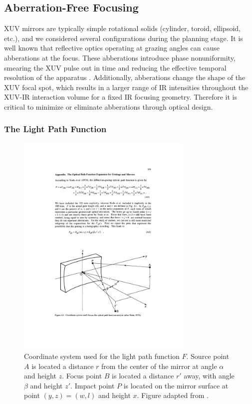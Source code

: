 \subsection{Aberration-Free Focusing}

XUV mirrors are typically simple rotational solids (cylinder, toroid, ellipsoid, etc.), and we considered several configurations during the planning stage. It is well known that reflective optics operating at grazing angles can cause abberations at the focus. These abberations introduce phase nonuniformity, smearing the XUV pulse out in time and reducing the effective temporal resolution of the apparatus \cite{bourassin-bouchetHowFocusAttosecond2013}. Additionally, abberations change the shape of the XUV focal spot, which results in a larger range of IR intensities throughout the XUV-IR interaction volume for a fixed IR focusing geometry. Therefore it is critical to minimize or eliminate abberations through optical design.

\subsubsection{The Light Path Function}

\begin{figure}
	\centering
	\includegraphics[width=0.75\textwidth]{figures/chap2/LPF_geometry.pdf}
	\caption{Coordinate system used for the light path function $F$. Source point $A$ is located a distance $r$ from the center of the mirror at angle $\alpha$ and height $z$. Focus point $B$ is located a distance $r'$ away, with angle $\beta$ and height $z'$. Impact point $P$ is located on the mirror surface at point $(y,z) = (w,l)$ and height $x$. Figure adapted from \cite{howellsMirrorsSynchrotronRadiationBeamlines1994}.}
	\label{fig:LPF_geometry}
\end{figure}

